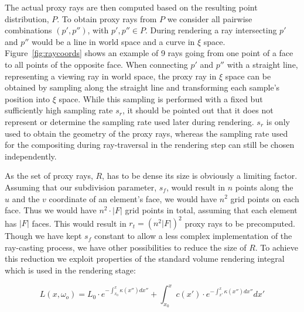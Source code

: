 \documentclass[journal]{vgtc}                %
\begin{document}
The actual proxy rays are then computed based on the resulting point distribution, $P$. To obtain proxy rays from $P$ we consider all pairwise combinations $(p',p'')$, with $p',p'' \in P$. During rendering a ray intersecting $p'$ and $p''$ would be a line in world space and a curve in $\xi$ space. Figure~\ref{fig:raycoords} shows an example of 9 rays going from one point of a face to all points of the opposite face. When connecting $p'$ and $p''$ with a straight line, representing a viewing ray in world space, the proxy ray in $\xi$ space can be obtained by sampling along the straight line and transforming each sample's position into $\xi$ space. While this sampling is performed with a fixed but sufficiently high sampling rate $s_r$, it should be pointed out that it does not represent or determine the sampling rate used later during rendering. $s_r$ is only used to obtain the geometry of the proxy rays, whereas the sampling rate used for the compositing during ray-traversal in the rendering step can still be chosen independently.

As the set of proxy rays, $R$, has to be dense its size is obviously a limiting factor. Assuming that our subdivision parameter, $s_f$, would result in $n$ points along the $u$ and the $v$ coordinate of an element's face, we would have $n^2$ grid points on each face. Thus we would have $n^2\cdot\left|F\right|$ grid points in total, assuming that each element has $\left|F\right|$ faces. This would result in $r_t = (n^2 \left|F\right|)^2$ proxy rays to be precomputed. Though we have kept $s_f$ constant to allow a less complex implementation of the ray-casting process, we have other possibilities to reduce the size of $R$. To achieve this reduction we exploit properties of the standard volume rendering integral which is used in the rendering stage:

$$ L(x,\omega_o) = L_0 \cdot e^{-\int_{x_0}^{x}\kappa(x'')dx''} + \int_{x_0}^{x}  \! c(x') \cdot e^{-\int_{x'}^{x}\kappa(x'')dx''} dx'$$
\end{document}
